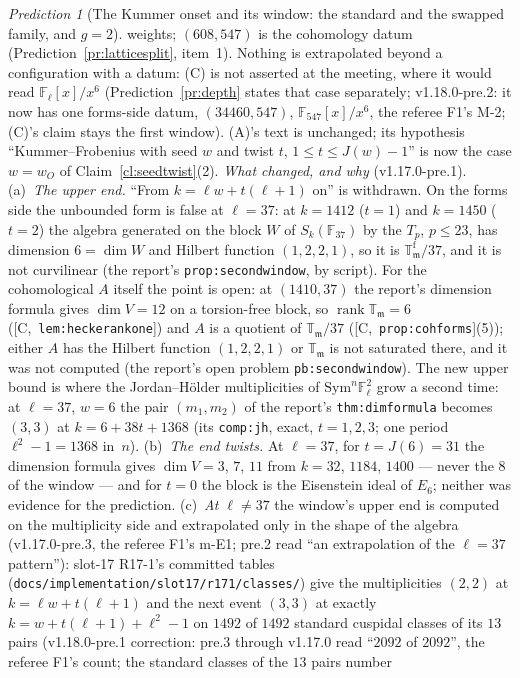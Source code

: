 \documentclass[11pt]{article}
\theoremstyle{remark}
\newtheorem{prediction}[theorem]{Prediction}
\newcommand{\F}{\mathbb{F}}
\newcommand{\Sym}{\mathrm{Sym}}
\newcommand{\Fl}{\F_\ell}
\DeclareMathOperator{\rank}{rank}
\newcommand{\T}{\mathbb{T}}
\newcommand{\m}{\mathfrak{m}}
\newcommand{\HA}[1]{[C,~\texttt{#1}]}      %
\begin{document}
\begin{prediction}[The Kummer onset and its window: the standard and the swapped family, and $g=2$]
weights; $(608,547)$ is the cohomology datum (Prediction~\ref{pr:latticesplit}, item~1). Nothing is extrapolated beyond a configuration with a datum: (C) is
not asserted at the meeting, where it would read $\Fl[x]/x^6$ (Prediction~\ref{pr:depth} states that case separately; v1.18.0-pre.2: it now has one
forms-side datum, $(34460,547)$, $\F_{547}[x]/x^6$, the referee F1's M-2; (C)'s claim stays the first window). (A)'s text is
unchanged; its hypothesis ``Kummer--Frobenius with seed $w$ and twist $t$, $1\le t\le J(w)-1$'' is now the case $w=w_O$ of Claim~\ref{cl:seedtwist}(2).
\emph{What changed, and why} (v1.17.0-pre.1). (a)~\emph{The upper end.} ``From $k=\ell w+t(\ell+1)$ on'' is withdrawn. On the forms side the unbounded
form is false at $\ell=37$: at $k=1412$ ($t=1$) and $k=1450$ ($t=2$) the algebra generated on the block $W$ of $S_k(\F_{37})$ by the $T_p$, $p\le23$, has
dimension $6=\dim W$ and Hilbert function $(1,2,2,1)$, so it is $\T^{\mathrm f}_\m/37$, and it is not curvilinear (the report's
\texttt{prop:secondwindow}, by script). For the cohomological $A$ itself the point is open: at $(1410,37)$ the report's dimension formula gives
$\dim V=12$ on a torsion-free block, so $\rank\T_\m=6$ (\HA{lem:heckerankone}) and $A$ is a quotient of $\T_\m/37$ (\HA{prop:cohforms}(5)); either $A$ has
the Hilbert function $(1,2,2,1)$ or $\T_\m$ is not saturated there, and it was not computed (the report's open problem \texttt{pb:secondwindow}). The
new upper bound is where the Jordan--H\"older multiplicities of $\Sym^{n}\F_\ell^{2}$ grow a second time: at $\ell=37$, $w=6$ the pair $(m_1,m_2)$ of the
report's \texttt{thm:dimformula} becomes $(3,3)$ at $k=6+38t+1368$ (its \texttt{comp:jh}, exact, $t=1,2,3$; one period $\ell^{2}-1=1368$ in~$n$).
(b)~\emph{The end twists.} At $\ell=37$, for $t=J(6)=31$ the dimension formula gives $\dim V=3$, $7$, $11$ from $k=32$, $1184$, $1400$ --- never the $8$
of the window --- and for $t=0$ the block is the Eisenstein ideal of $E_6$; neither was evidence for the prediction. (c)~\emph{At $\ell\ne37$} the window's
upper end is computed on the multiplicity side and extrapolated only in the shape of the algebra (v1.17.0-pre.3, the referee F1's m-E1; pre.2 read ``an
extrapolation of the $\ell=37$ pattern''): slot-17 R17-1's committed tables (\texttt{docs/implementation/slot17/r171/classes/}) give the multiplicities
$(2,2)$ at $k=\ell w+t(\ell+1)$ and the next event $(3,3)$ at exactly $k=w+t(\ell+1)+\ell^{2}-1$ on $1492$ of $1492$ standard cuspidal classes of its $13$ pairs
(v1.18.0-pre.1 correction: pre.3 through v1.17.0 read ``$2092$ of $2092$'', the referee F1's count; the standard classes of the $13$ pairs number

\end{prediction}
\end{document}

